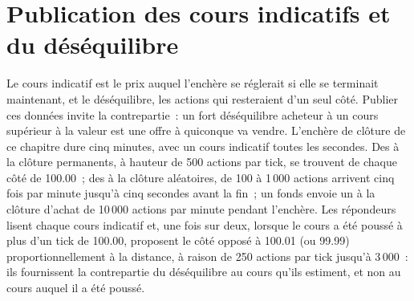 \label{lst:mx:auction-mechanics-and-theory:policy}

\section{Publication des cours indicatifs et du déséquilibre}

Le cours indicatif est le prix auquel l'enchère se réglerait si elle se terminait maintenant, et le déséquilibre, les actions qui resteraient d'un seul côté. Publier ces données
invite la contrepartie~: un fort déséquilibre acheteur à un cours supérieur à la valeur est une offre à quiconque va vendre. L'enchère de clôture de ce chapitre dure cinq minutes, avec
un cours indicatif toutes les secondes. Des  à la clôture permanents, à hauteur de 500 actions par tick, se trouvent de chaque côté de 100.00~; des  à la clôture aléatoires, de 100 à 1\,000
actions arrivent cinq fois par minute jusqu'à cinq secondes avant la fin~; un fonds envoie un  à la clôture d'achat de 10\,000 actions par minute pendant l'enchère.
Les répondeurs lisent chaque cours indicatif et, une fois sur deux, lorsque le cours a été poussé à plus d'un tick de 100.00, proposent le côté opposé à 100.01 (ou 99.99)
proportionnellement à la distance, à raison de 250 actions par tick jusqu'à 3\,000~: ils fournissent la contrepartie du déséquilibre au cours qu'ils estiment, et non au cours auquel il a été poussé.

\label{lst:mx:auction-mechanics-and-theory:resp}

